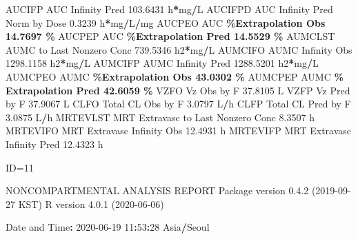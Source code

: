 \documentclass[
  10pt,
]{krantz}
\makeatletter
\newenvironment{Shaded}{\begin{snugshade}}{\end{snugshade}}
\newcommand{\DecValTok}[1]{\textcolor[rgb]{0.00,0.00,0.81}{#1}}
\newcommand{\FloatTok}[1]{\textcolor[rgb]{0.00,0.00,0.81}{#1}}
\newcommand{\NormalTok}[1]{#1}
\newcommand{\OperatorTok}[1]{\textcolor[rgb]{0.81,0.36,0.00}{\textbf{#1}}}
\newcommand{\StringTok}[1]{\textcolor[rgb]{0.31,0.60,0.02}{#1}}
\newenvironment{kframe}{%
\medskip{}
\setlength{\fboxsep}{.8em}
 \def\at@end@of@kframe{}%
 \ifinner\ifhmode%
  \def\at@end@of@kframe{\end{minipage}}%
  \begin{minipage}{\columnwidth}%
 \fi\fi%
 \def\FrameCommand##1{\hskip\@totalleftmargin \hskip-\fboxsep
 \colorbox{shadecolor}{##1}\hskip-\fboxsep
     \hskip-\linewidth \hskip-\@totalleftmargin \hskip\columnwidth}%
 \MakeFramed {\advance\hsize-\width
   \@totalleftmargin\z@ \linewidth\hsize
   \@setminipage}}%
 {\par\unskip\endMakeFramed%
 \at@end@of@kframe}
\renewenvironment{Shaded}{\begin{kframe}}{\end{kframe}}
\makeatother
\begin{document}
\begin{Shaded}
\begin{Highlighting}[]
\NormalTok{AUCIFP     AUC Infinity Pred                             }\FloatTok{103.6431}\NormalTok{ h}\OperatorTok{*}\NormalTok{mg}\OperatorTok{/}\NormalTok{L}
\NormalTok{AUCIFPD    AUC Infinity Pred Norm by Dose                  }\FloatTok{0.3239}\NormalTok{ h}\OperatorTok{*}\NormalTok{mg}\OperatorTok{/}\NormalTok{L}\OperatorTok{/}\NormalTok{mg}
\NormalTok{AUCPEO     AUC }\OperatorTok{\%Extrapolation Obs                         14.7697 \%}
\NormalTok{AUCPEP     AUC }\OperatorTok{\%Extrapolation Pred                        14.5529 \%}
\NormalTok{AUMCLST    AUMC to Last Nonzero Conc                     }\FloatTok{739.5346}\NormalTok{ h2}\OperatorTok{*}\NormalTok{mg}\OperatorTok{/}\NormalTok{L}
\NormalTok{AUMCIFO    AUMC Infinity Obs                            }\FloatTok{1298.1158}\NormalTok{ h2}\OperatorTok{*}\NormalTok{mg}\OperatorTok{/}\NormalTok{L}
\NormalTok{AUMCIFP    AUMC Infinity Pred                           }\FloatTok{1288.5201}\NormalTok{ h2}\OperatorTok{*}\NormalTok{mg}\OperatorTok{/}\NormalTok{L}
\NormalTok{AUMCPEO    AUMC }\OperatorTok{\%Extrapolation Obs                        43.0302 \%}
\NormalTok{AUMCPEP    AUMC }\OperatorTok{\% Extrapolation Pred                      42.6059 \%}
\NormalTok{VZFO       Vz Obs by F                                    }\FloatTok{37.8105}\NormalTok{ L}
\NormalTok{VZFP       Vz Pred by F                                   }\FloatTok{37.9067}\NormalTok{ L}
\NormalTok{CLFO       Total CL Obs by F                               }\FloatTok{3.0797}\NormalTok{ L}\OperatorTok{/}\NormalTok{h}
\NormalTok{CLFP       Total CL Pred by F                              }\FloatTok{3.0875}\NormalTok{ L}\OperatorTok{/}\NormalTok{h}
\NormalTok{MRTEVLST   MRT Extravasc to Last Nonzero Conc              }\FloatTok{8.3507}\NormalTok{ h}
\NormalTok{MRTEVIFO   MRT Extravasc Infinity Obs                     }\FloatTok{12.4931}\NormalTok{ h}
\NormalTok{MRTEVIFP   MRT Extravasc Infinity Pred                    }\FloatTok{12.4323}\NormalTok{ h}





\NormalTok{ID=}\DecValTok{11}

\NormalTok{                        NONCOMPARTMENTAL ANALYSIS REPORT}
\NormalTok{                       Package version }\DecValTok{0}\NormalTok{.}\FloatTok{4.2}\NormalTok{ (}\DecValTok{2019{-}09{-}27}\NormalTok{ KST)}
\NormalTok{                          R version }\DecValTok{4}\NormalTok{.}\FloatTok{0.1}\NormalTok{ (}\DecValTok{2020{-}06{-}06}\NormalTok{)}

\NormalTok{Date and Time}\OperatorTok{:}\StringTok{ }\DecValTok{2020{-}06{-}19} \DecValTok{11}\OperatorTok{:}\DecValTok{53}\OperatorTok{:}\DecValTok{28}\NormalTok{ Asia}\OperatorTok{/}\NormalTok{Seoul}


\end{Highlighting}
\end{Shaded}
\end{document}
